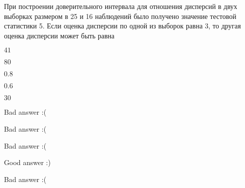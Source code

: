 
\begin{question}
При построении доверительного интервала для отношения дисперсий в двух
выборках размером в 25 и 16 наблюдений было получено значение тестовой
статистики 5. Если оценка дисперсии по одной из выборок равна 3, то
другая оценка дисперсии может быть равна
\begin{answerlist}
  \item \(41\)
  \item \(80\)
  \item \(0.8\)
  \item \(0.6\)
  \item \(30\)
\end{answerlist}
\end{question}

\begin{solution}
\begin{answerlist}
  \item Bad answer :(
  \item Bad answer :(
  \item Bad answer :(
  \item Good answer :)
  \item Bad answer :(
\end{answerlist}
\end{solution}

